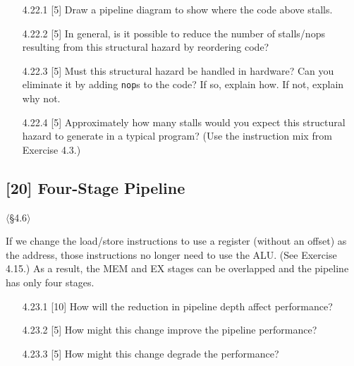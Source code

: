 \begin{enumerate}
  \item[4.22.1] [5] Draw a pipeline diagram to show where the code above
        stalls.
  \item[4.22.2] [5] In general, is it possible to reduce the number of
        stalls/nops resulting from this structural hazard by reordering code?
  \item[4.22.3] [5] Must this structural hazard be handled in hardware? Can
        you eliminate it by adding \texttt{nop}s to the code? If so, explain
        how. If not, explain why not.
  \item[4.22.4] [5] Approximately how many stalls would you expect this
        structural hazard to generate in a typical program? (Use the
        instruction mix from Exercise 4.3.)
\end{enumerate}

\problembreak

\subsection{[20] Four-Stage Pipeline}
\hypertarget{prob-4.23}{}
\noindent$\langle$\S4.6$\rangle$\medskip

\noindent If we change the load/store instructions to use a register (without
an offset) as the address, those instructions no longer need to use the ALU.
(See Exercise 4.15.) As a result, the MEM and EX stages can be overlapped and
the pipeline has only four stages.

\begin{enumerate}
  \item[4.23.1] [10] How will the reduction in pipeline depth affect
        performance?
  \item[4.23.2] [5] How might this change improve the pipeline performance?
  \item[4.23.3] [5] How might this change degrade the performance?
\end{enumerate}

